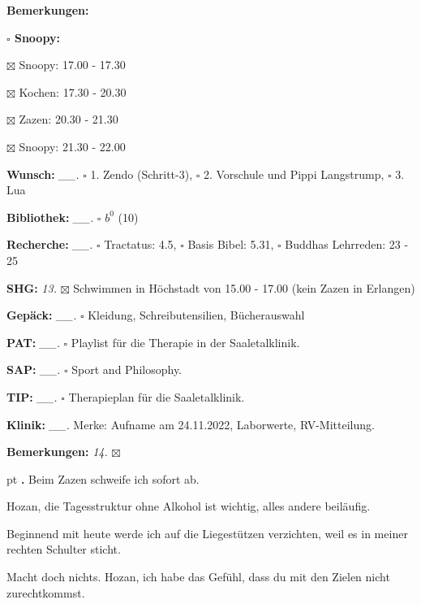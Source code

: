 \documentclass[10pt,a4paper]{article}
\newcounter{notec}
\newcommand\notep[1]{%
  \stepcounter{notec}
  \vskip #1pt
  {\bf\arabic{notec}.}
}
\newcommand\prop[1] {{\color {alizarin} {\bf #1}}}             %
\newcommand\opti[1] {{\color {amethyst} {\bf #1}}}             %
\newcommand\mand[1] {{\color {burntorange} {\bf #1}}}          %
\newcommand\bottomspace{\vskip 4pt}
\newcommand\n[1] { {\sl #1.} \hskip 5pt }
\begin{document}
\begin{mdframed}[style=daystyle]
\begin{labeling}{{\mand {Bemerkungen:}}}
\begin{minipage}{0.75\textwidth}
\begin{labeling}{\prop {$\square$ {Snoopy:}}}
      \item[$\boxtimes$ Snoopy:] 17.00 - 17.30
      \item[$\boxtimes$ Kochen:] 17.30 - 20.30
        
      \item[$\boxtimes$ Zazen:]  20.30 - 21.30
      \item[$\boxtimes$ Snoopy:] 21.30 - 22.00
      \end{labeling}
    \end{minipage}
    \bottomspace
  \item[{\mand {Wunsch:}}]       \n{\_\_} $\square$ 1. Zendo (Schritt-3),
      $\square$ 2. Vorschule und Pippi Langstrump, $\square$ 3. Lua
  \item[{\mand {Bibliothek:}}]   \n{\_\_} $\square$ $b^{0}$ (10)
  \item[{\mand {Recherche:}}]    \n{\_\_} $\square$ Tractatus: 4.5, $\square$ Basis Bibel: 5.31,
      $\square$ Buddhas Lehrreden: 23 - 25
  \item[{\mand {SHG:}}]            \n{13} $\boxtimes$ Schwimmen in Höchstadt von 15.00 - 17.00
      (kein Zazen in Erlangen)
  \item[{\mand {Gepäck:}}]       \n{\_\_} $\square$ Kleidung, Schreibutensilien, Bücherauswahl
  \item[{\opti {PAT:}}]          \n{\_\_} $\square$ Playlist für die Therapie in der Saaletalklinik.
  \item[{\opti {SAP:}}]          \n{\_\_} $\square$ Sport and Philosophy.
  \item[{\opti {TIP:}}]          \n{\_\_} $\square$ Therapieplan für die Saaletalklinik.
  \item[{\opti {Klinik:}}]       \n{\_\_} Merke: Aufname am 24.11.2022, Laborwerte, RV-Mitteilung.
  \item[{\mand {Bemerkungen:}}]    \n{14} $\boxtimes$
  \end{labeling}
    
  \setcounter{notec}{0}
  
  \notep 0 Beim Zazen schweife ich sofort ab.

  \vskip 2pt
  Hozan, die Tagesstruktur ohne Alkohol ist wichtig, alles andere beiläufig.

  \vskip 2pt
  Beginnend mit heute werde ich auf die Liegestützen verzichten, weil es in
  meiner rechten Schulter sticht.

  \vskip 2pt
  Macht doch nichts. Hozan, ich habe das Gefühl, dass du mit den Zielen nicht
  zurechtkommst.


\end{mdframed}
\end{document}
